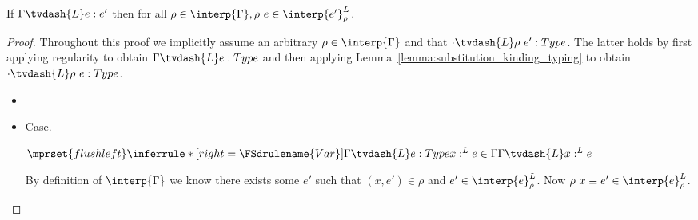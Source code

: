 \begin{thm}
  \label{thm:type_soundness}
  If $\Gamma \tvdash{L} e:e'$ then for all 
  $\rho \in \interp{\Gamma}, \rho\ e \in \interp{e'}^L_\rho$.
\end{thm}
\begin{proof}
  Throughout this proof we implicitly assume an arbitrary $\rho \in \interp{\Gamma}$ and
  that $\cdot \tvdash{L} \rho\ e':Type$.  The latter holds by first applying regularity to obtain
  $\Gamma \tvdash{L} e:Type$ and then applying Lemma~\ref{lemma:substitution_kinding_typing} to
  obtain $\cdot \tvdash{L}\rho\ e:Type$.
  
  \begin{itemize}
  \item[]\ \\
    
  \item[]Case.\ \\
    \begin{center}
      \begin{math}
        $$\mprset{flushleft}
        \inferrule* [right=\FSdrulename{Var}]{
          \Gamma \tvdash{L} e:Type
          \\\\
          x:^{L} e \in \Gamma
        }{\Gamma \tvdash{L} x:^{L} e}
      \end{math}
    \end{center}
    By definition of $\interp{\Gamma}$ we know there exists some $e'$
    such that $(x,e') \in \rho$ and $e' \in \interp{e}^L_\rho$.
    Now $\rho\ x \equiv e' \in \interp{e}^L_\rho$.
    

\end{itemize}
\end{proof}
